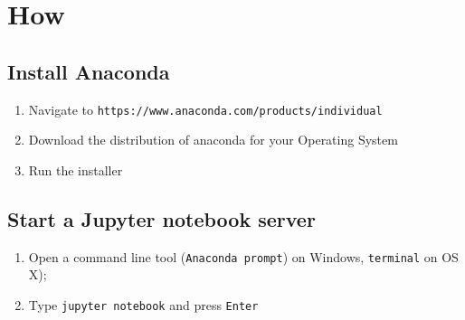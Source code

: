 \section{How}

\subsection{Install Anaconda}

\begin{enumerate}

\item 

Navigate to \texttt{https://www.anaconda.com/products/individual}

\item 

Download the distribution of anaconda for your Operating System

\item 

Run the installer

\end{enumerate}


\subsection{Start a Jupyter notebook server}


\begin{enumerate}

\item 

    Open a command line tool (\texttt{Anaconda prompt}) on Windows,
        \texttt{terminal} on OS X);

\item 

    Type \texttt{jupyter notebook} and press \texttt{Enter}

\end{enumerate}


